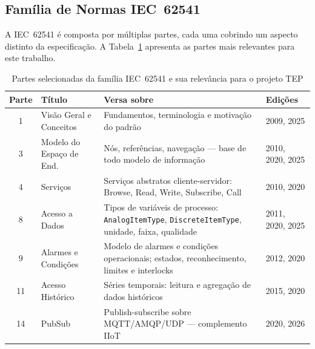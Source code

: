 \subsection{Família de Normas IEC~62541}

A IEC~62541 é composta por múltiplas partes, cada uma cobrindo um aspecto distinto da especificação. A Tabela~\ref{tab:iec62541} apresenta as partes mais relevantes para este trabalho.

\begin{table}[ht!]
	\centering
	\caption{Partes selecionadas da família IEC~62541 e sua relevância para o projeto TEP}
	\label{tab:iec62541}
	\begin{tabular}{|c|l|p{5cm}|p{3.2cm}|}
		\hline
		\textbf{Parte} & \textbf{Título}          & \textbf{Versa sobre}                                                                                                            & \textbf{Edições} \\
		\hline
		1              & Visão Geral e Conceitos  & Fundamentos, terminologia e motivação do padrão                                                                                 & 2009, 2025       \\
		\hline
		3              & Modelo do Espaço de End. & Nós, referências, navegação --- base de todo modelo de informação \cite{IEC62541_3}                                             & 2010, 2020, 2025 \\
		\hline
		4              & Serviços                 & Serviços abstratos cliente-servidor: Browse, Read, Write, Subscribe, Call                                                       & 2010, 2020       \\
		\hline
		8              & Acesso a Dados           & Tipos de variáveis de processo: \texttt{AnalogItemType}, \texttt{DiscreteItemType}, unidade, faixa, qualidade \cite{IEC62541_8} & 2011, 2020, 2025 \\
		\hline
		9              & Alarmes e Condições      & Modelo de alarmes e condições operacionais; estados, reconhecimento, limites e interlocks                                       & 2012, 2020       \\
		\hline
		11             & Acesso Histórico         & Séries temporais: leitura e agregação de dados históricos                                                                       & 2015, 2020       \\
		\hline
		14             & PubSub                   & Publish-subscribe sobre MQTT/AMQP/UDP --- complemento IIoT                                                                      & 2020, 2026       \\
		\hline
	\end{tabular}
\end{table}


